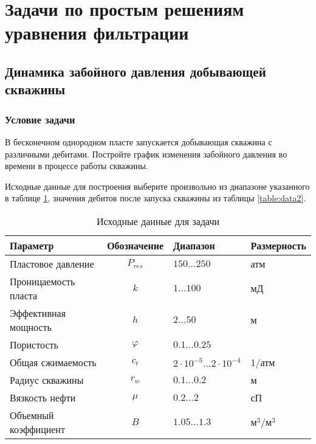 
\section{Задачи по простым решениям уравнения фильтрации}

\subsection{Динамика забойного давления добывающей скважины}

\subsubsection{Условие задачи}

В бесконечном однородном пласте запускается добывающая скважина с различными дебитами. 
Постройте график изменения забойного давления во времени в процессе работы скважины.

Исходные данные для построения выберите произвольно из диапазоне указанного в таблице \ref{table:data1}, значения дебитов после запуска скважины из таблицы \ref{table:data2}. 



\begin{table}[h!]
	{
		\caption{Исходные данные для задачи}
		\label{table:data1}
	}
	{
		\begin{tabular}{|l|c|l|l|}
			\hline
		\rowcolor{lightgray}	Параметр& Обозначение &Диапазон &Размерность \\
			\hline
			Пластовое давление&  $P_{res} $&$ 150 \dots 250$ &атм \\
			\hline
			Проницаемость пласта &$k $&$ 1 \dots 100$& мД  \\
			\hline
			Эффективная мощность & $h $&$ 2\dots50$ &м  \\
			\hline
			Пористость & $\varphi $&$ 0.1 \dots 0.25$&  \\
			\hline
			Общая сжимаемость& $c_{t} $&$ 2\cdot 10^{-5} \dots2\cdot 10^{-4} $ & 1/атм  \\
			\hline
			Радиус скважины &$r_{w} $&$ 0.1\dots0.2 $& м  \\
			\hline
			Вязкость нефти& $\mu $&$ 0.2\dots2$& сП  \\
			\hline
			Объемный коэффициент   &$B $&$ 1.05\dots 1.3$& м$^3$/м$^3$  \\
			\hline
		\end{tabular}
	
	}
\end{table}

